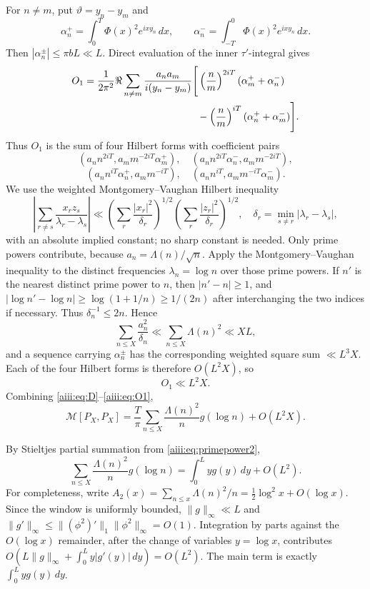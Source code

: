 \documentclass[11pt]{article}
\begin{document}
For $n\ne m$, put $\vartheta=y_n-y_m$ and
\[
 \alpha_n^+=\int_0^T\Phi(x)^2e^{ixy_n}\,dx,\qquad
 \alpha_n^-=\int_{-T}^{0}\Phi(x)^2e^{ixy_n}\,dx.
\]
Then $|\alpha_n^\pm|\le\pi bL\ll L$.  Direct evaluation of the inner
$\tau'$-integral gives
\begin{align*}
 O_1
 &=
 \frac1{2\pi^2}\Re\sum_{n\ne m}
 \frac{a_na_m}{i(y_n-y_m)}
 \Bigg[
 \left(\frac nm\right)^{2iT}
 (\alpha_m^++\alpha_n^-)\\
 &\hspace{40mm}-
 \left(\frac nm\right)^{iT}
 (\alpha_n^++\alpha_m^-)
 \Bigg].
\end{align*}
Thus $O_1$ is the sum of four Hilbert forms with coefficient pairs
\[
(a_nn^{2iT},a_mm^{-2iT}\alpha_m^+),\quad
(a_nn^{2iT}\alpha_n^-,a_mm^{-2iT}),
\]
\[
(a_nn^{iT}\alpha_n^+,a_mm^{-iT}),\quad
(a_nn^{iT},a_mm^{-iT}\alpha_m^-).
\]
We use the weighted Montgomery--Vaughan Hilbert inequality
\[
 \left|\sum_{r\ne s}\frac{x_rz_s}{\lambda_r-\lambda_s}\right|
 \ll
 \left(\sum_r\frac{|x_r|^2}{\delta_r}\right)^{1/2}
 \left(\sum_r\frac{|z_r|^2}{\delta_r}\right)^{1/2},
\quad
\delta_r=\min_{s\ne r}|\lambda_r-\lambda_s|,
\]
with an absolute implied constant; no sharp constant is needed.
Only prime powers contribute, because $a_n=\Lambda(n)/\sqrt n$.  Apply the
Montgomery--Vaughan inequality to the distinct frequencies
$\lambda_n=\log n$ over those prime powers.  If $n'$ is the nearest distinct
prime power to $n$, then $|n'-n|\ge1$, and
$|\log n'-\log n|\ge\log(1+1/n)\ge1/(2n)$ after interchanging the two
indices if necessary.  Thus
$\delta_n^{-1}\le2n$.  Hence
\[
 \sum_{n\le X}\frac{a_n^2}{\delta_n}
 \ll\sum_{n\le X}\Lambda(n)^2\ll XL,
\]
and a sequence carrying $\alpha_n^\pm$ has the corresponding weighted
square sum $\ll L^3X$.  Each of the four Hilbert forms is therefore
$O(L^2X)$, so
\begin{equation}\label{aiii:eq:O1}
 O_1\ll L^2X.
\end{equation}
Combining \eqref{aiii:eq:D}--\eqref{aiii:eq:O1},
\begin{equation}\label{aiii:eq:prime}
 \mathcal M[P_X,P_X]
 =\frac{T}{\pi}\sum_{n\le X}\frac{\Lambda(n)^2}{n}g(\log n)
 +O(L^2X).
\end{equation}

By Stieltjes partial summation from \eqref{aiii:eq:primepower2},
\begin{equation}\label{aiii:eq:partial}
 \sum_{n\le X}\frac{\Lambda(n)^2}{n}g(\log n)
 =\int_0^L y g(y)\,dy+O(L^2).
\end{equation}
For completeness, write
$A_2(x)=\sum_{n\le x}\Lambda(n)^2/n
=\tfrac12\log^2x+O(\log x)$.  Since the window is uniformly bounded,
$\|g\|_\infty\ll L$ and
$\|g'\|_\infty\le
\|(\phi^2)'\|_1\|\phi^2\|_\infty=O(1)$.
Integration by parts against the $O(\log x)$ remainder, after the change of
variables $y=\log x$, contributes
$O(L\|g\|_\infty+\int_0^L y|g'(y)|\,dy)=O(L^2)$.
The main term is exactly $\int_0^L yg(y)\,dy$.
\end{document}
